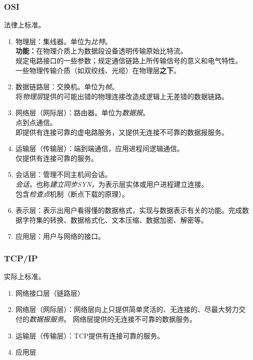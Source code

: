 \subsubsection{OSI}
法律上标准。
\begin{enumerate}
    \item 物理层：集线器。单位为\textit{比特}。 \\
    \textbf{功能：}在物理介质上为数据段设备透明传输原始比特流。 \\
    规定电路接口的一些参数；规定通信链路上所传输信号的意义和电气特性。 \\
    一些物理传输介质（如双绞线、光缆）在物理层\textbf{之下}。
    
    \item 数据链路层：交换机。单位为\textit{帧}。 \\
    将\textit{物理层}提供的可能出错的物理连接改造成逻辑上无差错的数据链路。
    
    \item 网络层（网际层）：路由器。单位为\textit{数据报}。 \\
    点到点通信。 \\
    即提供有连接可靠的虚电路服务，又提供无连接不可靠的数据报服务。
    
    \item 运输层（传输层）：端到端通信，应用进程间逻辑通信。 \\
    仅提供有连接可靠的服务。
    
    \item 会话层：管理不同主机间会话。 \\
    \textit{会话}，也称\textit{建立同步SYN}，为表示层实体或用户进程建立连接。 \\
    包含\textit{检查点}机制（断点下载的原理）。 \\
    
    \item 表示层：表示出用户看得懂的数据格式，实现与数据表示有关的功能。完成数据字符集的转换、数据格式化、文本压缩、数据加密、解密等。
    \item 应用层：用户与网络的接口。
\end{enumerate}


\subsubsection{TCP/IP}
实际上标准。
\begin{enumerate}
    \item 网络接口层（链路层）
    \item 网络层（网际层）：网络层向上只提供简单灵活的、无连接的、尽最大努力交付的\textit{数据报服务}。
    网络层提供的无连接不可靠的数据服务。
    \item 运输层（传输层）：TCP提供有连接可靠的服务。
    \item 应用层
\end{enumerate}


